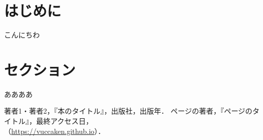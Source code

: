 \documentclass[uplatex,dvipdfmx]{vkaishi}
\begin{document}

\vcmaketitle %



\section*{はじめに}
こんにちわ


\section{セクション}
ああああ


\begin{thebibliography}{99}
   著者1・著者2，『本のタイトル』，出版社，出版年．
   ページの著者，『ページのタイトル』，最終アクセス日，\\（\url{https://vuccaken.github.io}）．
\end{thebibliography}
\end{document}
